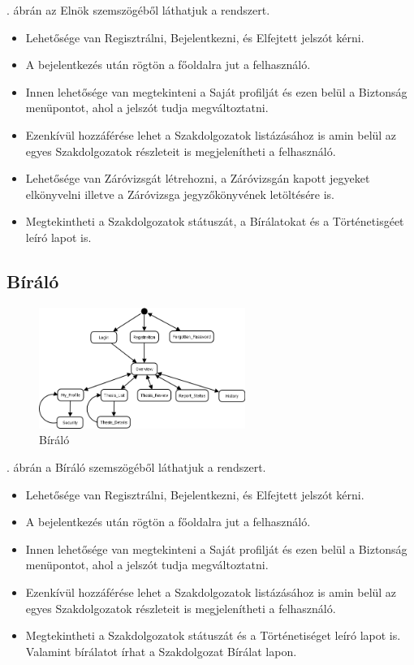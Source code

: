 \documentclass[a4paper,12pt]{article}
\begin{document}
. ábrán az Elnök szemszögéből láthatjuk a rendszert. 
\begin{itemize}
	\item Lehetősége van Regisztrálni, Bejelentkezni, és Elfejtett jelszót kérni. 
	\item A bejelentkezés után rögtön a főoldalra jut a felhasználó. 
	\item Innen lehetősége van megtekinteni a Saját profilját és ezen belül a Biztonság menüpontot, ahol a jelszót tudja megváltoztatni. 
	\item Ezenkívül hozzáférése lehet a Szakdolgozatok listázásához is amin belül az egyes Szakdolgozatok részleteit is megjelenítheti a felhasználó. 
	\item Lehetősége van Záróvizsgát létrehozni, a Záróvizsgán kapott jegyeket elkönyvelni illetve a Záróvizsga jegyzőkönyvének letöltésére is. 
	\item Megtekintheti a Szakdolgozatok státuszát, a Bírálatokat és a Történetisgéet leíró lapot is.
\end{itemize}

\subsection{Bíráló}

\begin{figure}[h!]
	\centering
	\includegraphics[width=0.6\textwidth]{images/Lapok_kozotti_atmenetek/Biralo.png}
	\caption{Bíráló}
	\label{fig:Biralo}
\end{figure}

. ábrán a Bíráló szemszögéből láthatjuk a rendszert. 

\begin{itemize}
	\item Lehetősége van Regisztrálni, Bejelentkezni, és Elfejtett jelszót kérni. 
	\item A bejelentkezés után rögtön a főoldalra jut a felhasználó. 
	\item Innen lehetősége van megtekinteni a Saját profilját és ezen belül a Biztonság menüpontot, ahol a jelszót tudja megváltoztatni. 
	\item Ezenkívül hozzáférése lehet a Szakdolgozatok listázásához is amin belül az egyes Szakdolgozatok részleteit is megjelenítheti a felhasználó. 
	\item Megtekintheti a Szakdolgozatok státuszát és a Történetiséget leíró lapot is. Valamint bírálatot írhat a Szakdolgozat Bírálat lapon. 
\end{itemize}
\end{document}
